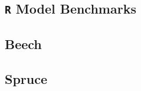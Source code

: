 \begin{landscape}

  \section{\texttt{R} Model Benchmarks}

  \subsection{Beech}
  
  
  

  \subsection{Spruce}
  
  
  

\end{landscape}

